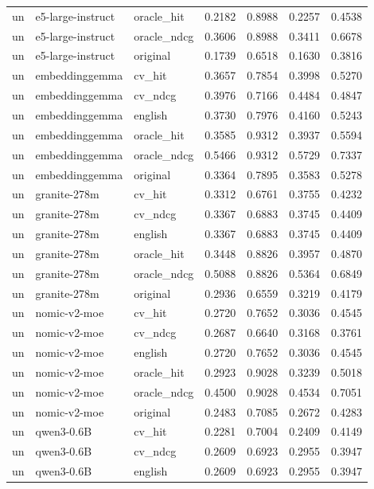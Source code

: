 \begin{tabular}{lllrrrr}
un & e5-large-instruct & oracle\_hit & 0.2182 & 0.8988 & 0.2257 & 0.4538 \\
un & e5-large-instruct & oracle\_ndcg & 0.3606 & 0.8988 & 0.3411 & 0.6678 \\
un & e5-large-instruct & original & 0.1739 & 0.6518 & 0.1630 & 0.3816 \\
un & embeddinggemma & cv\_hit & 0.3657 & 0.7854 & 0.3998 & 0.5270 \\
un & embeddinggemma & cv\_ndcg & 0.3976 & 0.7166 & 0.4484 & 0.4847 \\
un & embeddinggemma & english & 0.3730 & 0.7976 & 0.4160 & 0.5243 \\
un & embeddinggemma & oracle\_hit & 0.3585 & 0.9312 & 0.3937 & 0.5594 \\
un & embeddinggemma & oracle\_ndcg & 0.5466 & 0.9312 & 0.5729 & 0.7337 \\
un & embeddinggemma & original & 0.3364 & 0.7895 & 0.3583 & 0.5278 \\
un & granite-278m & cv\_hit & 0.3312 & 0.6761 & 0.3755 & 0.4232 \\
un & granite-278m & cv\_ndcg & 0.3367 & 0.6883 & 0.3745 & 0.4409 \\
un & granite-278m & english & 0.3367 & 0.6883 & 0.3745 & 0.4409 \\
un & granite-278m & oracle\_hit & 0.3448 & 0.8826 & 0.3957 & 0.4870 \\
un & granite-278m & oracle\_ndcg & 0.5088 & 0.8826 & 0.5364 & 0.6849 \\
un & granite-278m & original & 0.2936 & 0.6559 & 0.3219 & 0.4179 \\
un & nomic-v2-moe & cv\_hit & 0.2720 & 0.7652 & 0.3036 & 0.4545 \\
un & nomic-v2-moe & cv\_ndcg & 0.2687 & 0.6640 & 0.3168 & 0.3761 \\
un & nomic-v2-moe & english & 0.2720 & 0.7652 & 0.3036 & 0.4545 \\
un & nomic-v2-moe & oracle\_hit & 0.2923 & 0.9028 & 0.3239 & 0.5018 \\
un & nomic-v2-moe & oracle\_ndcg & 0.4500 & 0.9028 & 0.4534 & 0.7051 \\
un & nomic-v2-moe & original & 0.2483 & 0.7085 & 0.2672 & 0.4283 \\
un & qwen3-0.6B & cv\_hit & 0.2281 & 0.7004 & 0.2409 & 0.4149 \\
un & qwen3-0.6B & cv\_ndcg & 0.2609 & 0.6923 & 0.2955 & 0.3947 \\
un & qwen3-0.6B & english & 0.2609 & 0.6923 & 0.2955 & 0.3947 \\

\end{tabular}
